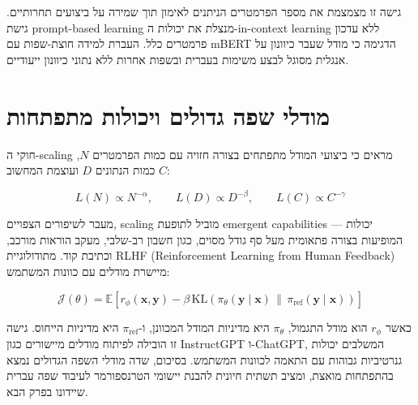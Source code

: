 גישה זו מצמצמת את מספר הפרמטרים הניתנים לאימון תוך שמירה על ביצועים תחרותיים. גישת \textenglish{prompt-based learning} מנצלת את יכולות ה-\textenglish{in-context learning} ללא עדכון פרמטרים כלל. העברת למידה חוצת-שפות עם \textenglish{mBERT} \cite{pires2019multilingual} הדגימה כי מודל שעבר כיוונון על אנגלית מסוגל לבצע משימות בעברית ובשפות אחרות ללא נתוני כיוונון ייעודיים.

\section{מודלי שפה גדולים ויכולות מתפתחות}

חוקי ה-\textenglish{scaling} \cite{brown2020language} מראים כי ביצועי המודל מתפתחים בצורה חזויה עם כמות הפרמטרים \(N\), כמות הנתונים \(D\) ועוצמת המחשוב \(C\):

\begin{equation}
L(N) \propto N^{-\alpha}, \qquad L(D) \propto D^{-\beta}, \qquad L(C) \propto C^{-\gamma}
\end{equation}

מעבר לשיפורים הצפויים, \textenglish{scaling} מוביל לתופעת \textenglish{emergent capabilities} --- יכולות המופיעות בצורה פתאומית מעל סף גודל מסוים, כגון חשבון רב-שלבי, מעקב הוראות מורכב, וכתיבת קוד. מתודולוגיית \textenglish{RLHF} (\textenglish{Reinforcement Learning from Human Feedback}) מיישרת מודלים עם כוונות המשתמש:

\begin{equation}
\mathcal{J}(\theta) = \mathbb{E}\!\left[r_\phi(\mathbf{x}, \mathbf{y}) - \beta \, \mathrm{KL}\!\left(\pi_\theta(\mathbf{y}\mid\mathbf{x}) \,\|\, \pi_{\text{ref}}(\mathbf{y}\mid\mathbf{x})\right)\right]
\end{equation}

כאשר \(r_\phi\) הוא מודל התגמול, \(\pi_\theta\) היא מדיניות המודל המכוונן, ו-\(\pi_{\text{ref}}\) היא מדיניות הייחוס. גישה זו הובילה לפיתוח מודלים מיישורים כגון \textenglish{InstructGPT} ו-\textenglish{ChatGPT}, המשלבים יכולות גנרטיביות גבוהות עם התאמה לכוונות המשתמש. בסיכום, שדה מודלי השפה הגדולים נמצא בהתפתחות מואצת, ומציב תשתית חיונית להבנת יישומי הטרנספורמר לעיבוד שפה עברית שיידונו בפרק הבא.
